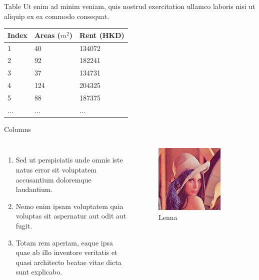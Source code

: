 \documentclass{beamer}
\begin{document}
\begin{frame}{Table}
    Ut enim ad minim veniam, quis nostrud exercitation ullamco laboris nisi ut aliquip ex ea commodo consequat.
    \vspace{0.4in}
    \begin{table}
        \footnotesize
        \begin{tabular}{l | l | l}
        Index & Areas ($m^2$) & Rent (HKD) \\
        \hline \hline
        1 & 40 & 134072 \\ 
        2 & 92 & 182241 \\
        3 & 37 & 134731 \\
        4 & 124 & 204325 \\
        5 & 88 & 187375 \\
        ... & ... & ...
        \end{tabular}
    \end{table}
\end{frame}


\begin{frame}{Columns}
    \begin{columns}
        \begin{enumerate}
            \item Sed ut perspiciatis unde omnis iste natus error sit voluptatem accusantium doloremque laudantium.
            \item Nemo enim ipsam voluptatem quia voluptas sit aspernatur aut odit aut fugit.
            \item Totam rem aperiam, eaque ipsa quae ab illo inventore veritatis et quasi architecto beatae vitae dicta sunt explicabo.
        \end{enumerate}
        \begin{figure}
            \includegraphics[width=0.8\textwidth]{images/lenna.jpg}
            \caption{Lenna}
    \end{figure}
    \end{columns}
\end{frame}
\end{document}
